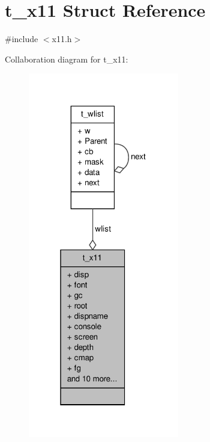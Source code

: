 \hypertarget{structt__x11}{\section{t\-\_\-x11 \-Struct \-Reference}
\label{structt__x11}
}


{\ttfamily \#include $<$x11.\-h$>$}



\-Collaboration diagram for t\-\_\-x11\-:
\nopagebreak
\begin{figure}[H]
\begin{center}
\leavevmode
\includegraphics[width=187pt]{structt__x11__coll__graph}
\end{center}
\end{figure}
